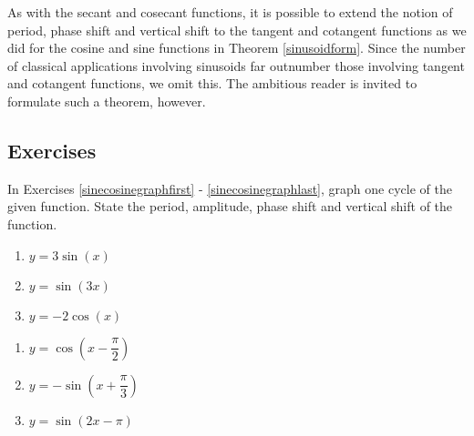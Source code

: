 As with the secant and cosecant functions, it is possible to extend the notion of period, phase shift and vertical shift to the tangent and cotangent functions as we did for the cosine and sine functions in Theorem \ref{sinusoidform}.  Since the number of classical applications involving sinusoids far outnumber those involving tangent and cotangent functions, we omit this.  The ambitious reader is invited to formulate such a theorem, however.

\newpage

\subsection{Exercises}

In Exercises \ref{sinecosinegraphfirst} - \ref{sinecosinegraphlast}, graph one cycle of the given function.  State the period, amplitude, phase shift and vertical shift of the function.

\begin{multicols}{3}

\begin{enumerate}

\item $y = 3\sin(x)$ \label{sinecosinegraphfirst}
\item $y = \sin(3x)$
\item $y = -2\cos(x)$

\setcounter{HW}{\value{enumi}}

\end{enumerate}

\end{multicols}

\begin{multicols}{3}

\begin{enumerate}

\setcounter{enumi}{\value{HW}}

\item $y = \cos \left( x - \dfrac{\pi}{2} \right)$
\item $y = -\sin \left( x + \dfrac{\pi}{3} \right)$
\item $y = \sin(2x - \pi)$ 

\setcounter{HW}{\value{enumi}}

\end{enumerate}

\end{multicols}

